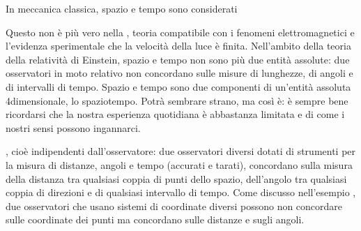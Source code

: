 \documentclass[letterpaper,10pt,italian]{jupyterBook}
\begin{document}
\sphinxAtStartPar
In meccanica classica, spazio e tempo sono considerati %
\begin{footnote}[1]\sphinxAtStartFootnote
Questo non è più vero nella {\hyperref[\detokenize{ch/modern/einstein:physics-hs-modern-einstein-special}]{}}, teoria compatibile con i fenomeni elettromagnetici e l’evidenza sperimentale che la velocità della luce è finita. Nell’ambito della teoria della relatività di Einstein, spazio e tempo non sono più due entità assolute: due osservatori in moto relativo non concordano sulle misure di lunghezze, di angoli e di intervalli di tempo. Spazio e tempo sono due componenti di un’entità assoluta 4\sphinxhyphen{}dimensionale, lo spazio\sphinxhyphen{}tempo. Potrà sembrare strano, ma così è: è sempre bene ricordarsi che la nostra esperienza quotidiana è abbastanza limitata e di come i nostri sensi possono ingannarci.
%
\end{footnote}, cioè indipendenti dall’osservatore: due osservatori diversi dotati di strumenti per la misura di distanze, angoli e tempo (accurati e tarati), concordano sulla misura della distanza tra qualsiasi coppia di punti dello spazio, dell’angolo tra qualsiasi coppia di direzioni e di qualsiasi intervallo di tempo. Come discusso nell’esempio {\hyperref[\detokenize{ch/mechanics/kinematics:invariance-space-and-time}]{}}, due osservatori che usano sistemi di coordinate diversi possono non concordare sulle coordinate dei punti ma concordano sulle distanze e sugli angoli.
\end{document}
